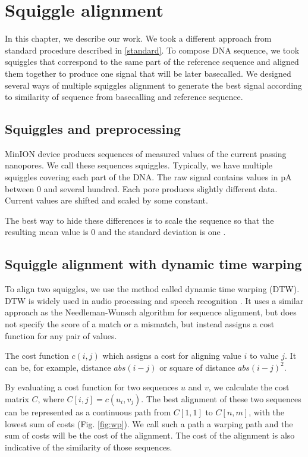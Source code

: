 \chapter{Squiggle alignment}

\label{kap:squiggles} %

In this chapter, we describe our work. 
We took a different approach from standard procedure described in \ref{standard}.
To compose DNA sequence, we took squiggles that correspond to the same part of the reference sequence and aligned them together to produce one signal that will be later basecalled. We designed several ways of multiple squiggles alignment to generate the best signal according to similarity of sequence from basecalling and reference sequence.

\section{Squiggles and preprocessing}

MinION device produces sequences of measured values of the current passing nanopores. We call these sequences squiggles.
Typically, we have multiple squiggles covering each part of the DNA. The raw signal contains values in pA between $0$ and several hundred. 
Each pore produces slightly different data. Current values are shifted and scaled by some constant.

The best way to hide these differences is to scale the sequence so that the resulting mean value is 0 and the standard deviation is one 
\cite{kubo}.

\section{Squiggle alignment with dynamic time warping}
To align two squiggles, we use the method called dynamic time warping (DTW).
DTW is widely used in audio processing and speech recognition \cite{muller2007dynamic}.
It uses a similar approach as the Needleman-Wunsch algorithm for sequence alignment, but 
does not specify the score of a match or a mismatch, but instead assigns a cost function for any pair of values.

The cost function $c(i,j)$ which assigns a cost for aligning value $i$ to value $j$. 
It can be, for example, distance $abs(i-j)$ or square of distance $abs(i-j)^2$.

By evaluating a cost function for two sequences $u$ and $v$, we calculate the cost matrix $C$, where $C[i,j] = c(u_i,v_j)$.
The best alignment of these two sequences can be represented as a continuous path from $C[1,1]$ to $C[n,m]$, with the lowest sum of costs (Fig. \ref{fig:wp}). 
We call such a path a warping path and the sum of costs will be the cost of the alignment. The cost of the alignment is also indicative of the similarity of those sequences.


